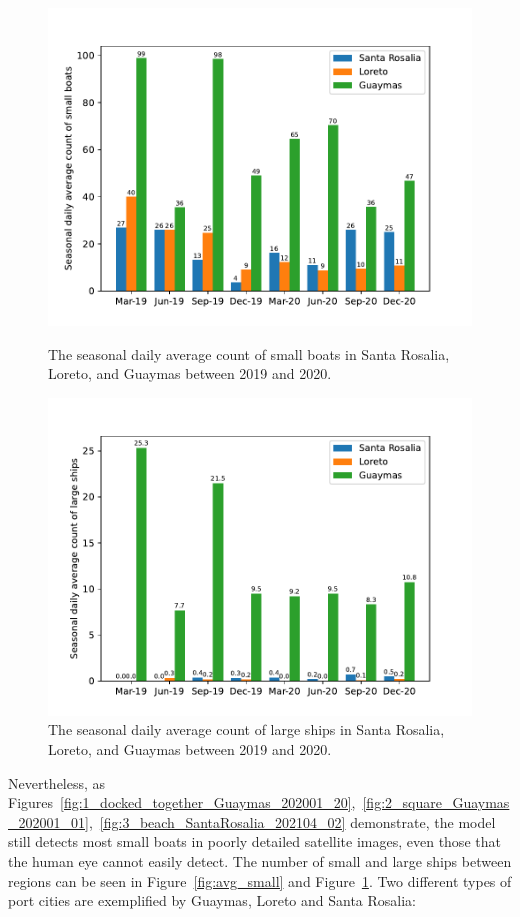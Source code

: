 \begin{figure}[t]
    \center
    \includegraphics[width=\columnwidth]{img/avg_small.pdf}
    \caption{The seasonal daily average count of small boats in Santa Rosalia, Loreto, and Guaymas between 2019 and 2020.}
    \label{fig:avg_small}

    \center
    \includegraphics[width=\columnwidth]{img/avg_big.pdf}
    \caption{The seasonal daily average count of large ships in Santa Rosalia, Loreto, and Guaymas between 2019 and 2020.}
    \label{fig:avg_big}
\end{figure}

Nevertheless, as Figures~\ref{fig:1_docked_together_Guaymas_202001_20},~\ref{fig:2_square_Guaymas_202001_01},~\ref{fig:3_beach_SantaRosalia_202104_02} demonstrate, the model still detects most small boats in poorly detailed satellite images, even those that the human eye cannot easily detect. The number of small and large ships between regions can be seen in Figure~\ref{fig:avg_small} and Figure~\ref{fig:avg_big}. Two different types of port cities are exemplified by Guaymas, Loreto and Santa Rosalia:



